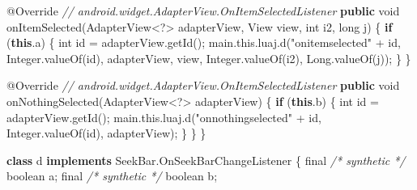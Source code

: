 \documentclass[
]{article}
\newenvironment{Shaded}{}{}
\newcommand{\AttributeTok}[1]{\textcolor[rgb]{0.49,0.56,0.16}{#1}}
\newcommand{\BuiltInTok}[1]{\textcolor[rgb]{0.00,0.50,0.00}{#1}}
\newcommand{\CommentTok}[1]{\textcolor[rgb]{0.38,0.63,0.69}{\textit{#1}}}
\newcommand{\ControlFlowTok}[1]{\textcolor[rgb]{0.00,0.44,0.13}{\textbf{#1}}}
\newcommand{\DataTypeTok}[1]{\textcolor[rgb]{0.56,0.13,0.00}{#1}}
\newcommand{\FunctionTok}[1]{\textcolor[rgb]{0.02,0.16,0.49}{#1}}
\newcommand{\KeywordTok}[1]{\textcolor[rgb]{0.00,0.44,0.13}{\textbf{#1}}}
\newcommand{\NormalTok}[1]{#1}
\newcommand{\OperatorTok}[1]{\textcolor[rgb]{0.40,0.40,0.40}{#1}}
\newcommand{\StringTok}[1]{\textcolor[rgb]{0.25,0.44,0.63}{#1}}
\begin{document}
\begin{Shaded}
\begin{Highlighting}[]
        \AttributeTok{@Override} \CommentTok{// android.widget.AdapterView.OnItemSelectedListener}
        \KeywordTok{public} \DataTypeTok{void} \FunctionTok{onItemSelected}\OperatorTok{(}\NormalTok{AdapterView}\OperatorTok{\textless{}?\textgreater{}}\NormalTok{ adapterView}\OperatorTok{,} \BuiltInTok{View}\NormalTok{ view}\OperatorTok{,} \DataTypeTok{int}\NormalTok{ i2}\OperatorTok{,} \DataTypeTok{long}\NormalTok{ j}\OperatorTok{)} \OperatorTok{\{}
            \ControlFlowTok{if} \OperatorTok{(}\KeywordTok{this}\OperatorTok{.}\FunctionTok{a}\OperatorTok{)} \OperatorTok{\{}
                \DataTypeTok{int}\NormalTok{ id }\OperatorTok{=}\NormalTok{ adapterView}\OperatorTok{.}\FunctionTok{getId}\OperatorTok{();}
\NormalTok{                main}\OperatorTok{.}\FunctionTok{this}\OperatorTok{.}\FunctionTok{luaj}\OperatorTok{.}\FunctionTok{d}\OperatorTok{(}\StringTok{"onitemselected"} \OperatorTok{+}\NormalTok{ id}\OperatorTok{,} \BuiltInTok{Integer}\OperatorTok{.}\FunctionTok{valueOf}\OperatorTok{(}\NormalTok{id}\OperatorTok{),}\NormalTok{ adapterView}\OperatorTok{,}\NormalTok{ view}\OperatorTok{,} \BuiltInTok{Integer}\OperatorTok{.}\FunctionTok{valueOf}\OperatorTok{(}\NormalTok{i2}\OperatorTok{),} \BuiltInTok{Long}\OperatorTok{.}\FunctionTok{valueOf}\OperatorTok{(}\NormalTok{j}\OperatorTok{));}
            \OperatorTok{\}}
        \OperatorTok{\}}

        \AttributeTok{@Override} \CommentTok{// android.widget.AdapterView.OnItemSelectedListener}
        \KeywordTok{public} \DataTypeTok{void} \FunctionTok{onNothingSelected}\OperatorTok{(}\NormalTok{AdapterView}\OperatorTok{\textless{}?\textgreater{}}\NormalTok{ adapterView}\OperatorTok{)} \OperatorTok{\{}
            \ControlFlowTok{if} \OperatorTok{(}\KeywordTok{this}\OperatorTok{.}\FunctionTok{b}\OperatorTok{)} \OperatorTok{\{}
                \DataTypeTok{int}\NormalTok{ id }\OperatorTok{=}\NormalTok{ adapterView}\OperatorTok{.}\FunctionTok{getId}\OperatorTok{();}
\NormalTok{                main}\OperatorTok{.}\FunctionTok{this}\OperatorTok{.}\FunctionTok{luaj}\OperatorTok{.}\FunctionTok{d}\OperatorTok{(}\StringTok{"onnothingselected"} \OperatorTok{+}\NormalTok{ id}\OperatorTok{,} \BuiltInTok{Integer}\OperatorTok{.}\FunctionTok{valueOf}\OperatorTok{(}\NormalTok{id}\OperatorTok{),}\NormalTok{ adapterView}\OperatorTok{);}
            \OperatorTok{\}}
        \OperatorTok{\}}
    \OperatorTok{\}}

    \KeywordTok{class}\NormalTok{ d }\KeywordTok{implements}\NormalTok{ SeekBar}\OperatorTok{.}\FunctionTok{OnSeekBarChangeListener} \OperatorTok{\{}
        \DataTypeTok{final} \CommentTok{/* synthetic */} \DataTypeTok{boolean}\NormalTok{ a}\OperatorTok{;}
        \DataTypeTok{final} \CommentTok{/* synthetic */} \DataTypeTok{boolean}\NormalTok{ b}\OperatorTok{;}


\end{Highlighting}
\end{Shaded}
\end{document}
